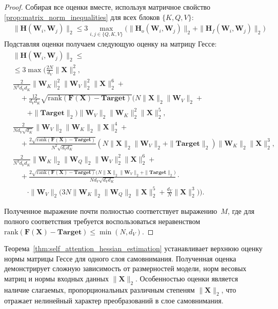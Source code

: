 \begin{proof}
Собирая все оценки вместе, используя матричное свойство \ref{prop:matrix_norm_inequalities} для всех блоков $\{K, Q, V\}$:
\begin{align}
    &\| \mathbf{H} (\mathbf{W}_i, \mathbf{W}_j)\|_2 \leq 3\max \limits_{i,j \in \{Q, K, V\}} \Big(\|\mathbf{H}_o(\mathbf{W}_i, \mathbf{W}_j)\|_2 + \|\mathbf{H}_f(\mathbf{W}_i, \mathbf{W}_j)\|_2\Big)
\end{align}
Подставляя оценки получаем следующую оценку на матрицу Гессе:
\begin{align}
    &\| \mathbf{H} (\mathbf{W}_i, \mathbf{W}_j)\|_2 \leq\\
    & \leq 3 \max \Bigg(\frac{2N}{d_V} \| \mathbf{X}\|^2_2, \\
    &\frac{2}{N^3 d_V d_K} \| \mathbf{W}_K\|_2^2 \| \mathbf{W}_V\|^2_2 \| \mathbf{X}\|^6_2 +\\
    &\quad+ \frac{12}{d_V d_K} \sqrt{\mathrm{rank}(\mathbf{F}(\mathbf{X}) - \textbf{Target})} \Big(N \|\mathbf{X}\|_2 \|\mathbf{W}_V \|_2 +\\
    &\qquad+\|\textbf{Target}\|_2\Big) \| \mathbf{W}_V \|_2 \| \mathbf{W}_K\|^2_2 \| \mathbf{X}\|^5_2, \\
    &\frac{2}{N d_V \sqrt{d_K}} \| \mathbf{W}_V\|_2 \| \mathbf{W}_K \|_2 \| \mathbf{X}\|^4_2 +\\
    &\quad+\frac{2\sqrt{\mathrm{rank}(\mathbf{F}(\mathbf{X}) - \textbf{Target})}}{N^2\sqrt{d_V d_K}} (N \|\mathbf{X}\|_2 \|\mathbf{W}_V \|_2 + \|\textbf{Target}\|_2) \|\mathbf{W}_K\|_2 \|\mathbf{X}\|^3_2,\\
    &\frac{2}{N^3 d_V d_K} \|\mathbf{W}_K\|_2 \|\mathbf{W}_Q\|_2 \| \mathbf{W}_V\|^2_2 \|\mathbf{X} \|^6_2 + \\
    &\quad+\frac{2\sqrt{\mathrm{rank}(\mathbf{F}(\mathbf{X}) - \textbf{Target})} \Big(N \|\mathbf{X}\|_2 \|\mathbf{W}_V \|_2 + \|\textbf{Target}\|_2\Big)}{N d_V \sqrt{d_V d_K}} \cdot\\
    &\qquad\cdot\|\mathbf{W}_V\|_2 \Big(3N \|\mathbf{W}_K\|_2 \|\mathbf{W}_Q\|_2 \| \mathbf{X}\|^5_2 + \frac{d_V}{N} \|\mathbf{X}\|^3_2\Big)\Bigg).
\end{align}

Полученное выражение почти полностью соответствует выражению~$M$, где для полного соответствия требуется воспользоваться неравенством~$\mathrm{rank}(\mathbf{F}(\mathbf{X}) - \textbf{Target}) \le \min(N, d_V)$. 
\end{proof}

Теорема~\ref{thm:self_attention_hessian_estimation} устанавливает верхнюю оценку нормы матрицы Гессе для одного слоя самовнимания. Полученная оценка демонстрирует сложную зависимость от размерностей модели, норм весовых матриц и нормы входных данных $\|\mathbf{X}\|_2$. Особенностью оценки является наличие слагаемых, пропорциональных различным степеням $\|\mathbf{X}\|_2$, что отражает нелинейный характер преобразований в слое самовнимания.

